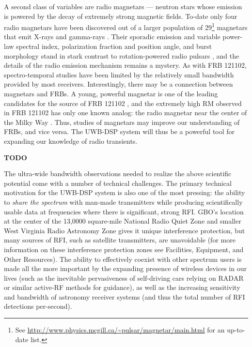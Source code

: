 \documentclass[10pt]{myNSF}
\begin{document}
A second class of variables are radio magnetars --- neutron stars
whose emission is powered by the decay of extremely strong magnetic
fields.  To-date only four radio magnetars have been discovered out of
a larger population of 29\footnote{See
  \url{http://www.physics.mcgill.ca/~pulsar/magnetar/main.html} for an
  up-to-date list.} magnetars that emit X-rays and gamma-rays
\citep{crh+06,crh+07,lbb+10,efk+13}.  Their sporadic emission and
variable power-law spectral index, polarization fraction and position
angle, and burst morphology stand in stark contrast to
rotation-powered radio pulsars \citep[e.g.][]{crp+07}, and the details
of the radio emission mechanism remains a mystery.  As with FRB
121102, spectro-temporal studies have been limited by the relatively
small bandwidth provided by most receivers.  Interestingly, there may
be a connection between magnetars and FRBs.  A young, powerful
magnetar is one of the leading candidates for the source of FRB 121102
\citep[e.g.][]{mm18}, and the extremely high RM observed in FRB 121102
has only one known analog: the radio magnetar near the center of the
Milky Way \citep{efk+13}.  Thus, studies of magnetars may improve our
understanding of FRBs, and vice versa.  The UWB-DSP system will thus
be a powerful tool for expanding our knowledge of radio transients.

 \textbf{TODO}

\label{sec:technical_motivation}

The ultra-wide bandwidth observations needed to realize the above
scientific potential come with a number of technical challenges.  The
primary technical motivation for the UWB-DSP system is also one of the
most pressing: the ability to \emph{share the spectrum} with man-made
transmitters while producing scientifically usable data at frequencies
where there is significant, strong RFI.  GBO's location at the center
of the 13,0000 square-mile National Radio Quiet Zone and smaller West
Virginia Radio Astronomy Zone gives it unique interference protection,
but many sources of RFI, such as satellite transmitters, are
unavoidable (for more information on these interference protection
zones see Facilities, Equipment, and Other Resources).  The ability to
effectively coexist with other spectrum users is made all the more
important by the expanding presence of wireless devices in our lives
(such as the inevitable pervasiveness of self-driving cars relying on
RADAR or similar active-RF methods for guidance), as well as the
increasing sensitivity and bandwidth of astronomy receiver systems
(and thus the total number of RFI detections per-second).
\end{document}
